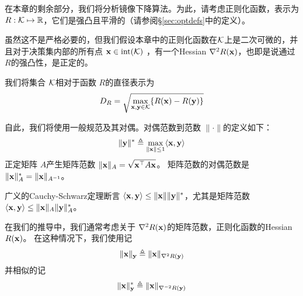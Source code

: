 在本章的剩余部分，我们将分析镜像下降算法。为此，请考虑正则化函数，表示为 $R : \mathcal K \mapsto {\mathbb R} $，它们是强凸且平滑的（请参阅\S\ref{sec:optdefs}中的定义）。

虽然这不是严格必要的，但我们假设本章中的正则化函数在$\mathcal K$上是二次可微的，并且对于决策集内部的所有点 $\mathbf x \in \text{int}(\mathcal K)$ ，有一个Hessian $\nabla^2 R(\mathbf x)$，也即是说通过 $R$的强凸性，是正定的。

我们将集合 $\mathcal K$相对于函数 $R$的直径表示为
$$ D_R = \sqrt{ \max_{\mathbf x,\mathbf y \in \mathcal K} \{ R(\mathbf x) - R(\mathbf y) \}}$$ 

自此，我们将使用一般规范及其对偶。对偶范数到范数 $\| \cdot \|$的定义如下：
$$ \| \mathbf y \|^* \triangleq \max_{ \| \mathbf x \| \leq 1 }  \langle \mathbf x, \mathbf y \rangle $$
正定矩阵 $A$产生矩阵范数 $\|\mathbf x\|_A = \sqrt{\mathbf x^\top A \mathbf x}$。
矩阵范数的对偶范数是 $\|\mathbf x\|_A^*=\|\mathbf x\|_{A^{-1}}$。

广义的Cauchy-Schwarz定理断言 $ \langle \mathbf x , \mathbf y \rangle \leq \| \mathbf x \| \| \mathbf y \|^*$，尤其是矩阵范数 $\langle \mathbf x , \mathbf y \rangle \leq \|\mathbf x\|_A \| \mathbf y\|_A^*$。

在我们的推导中，我们通常考虑关于 $\nabla^2R(\mathbf x)$的矩阵范数，正则化函数的Hessian $R(\mathbf x)$。
在这种情况下，我们使用记
$$\|\mathbf x\|_{\mathbf y} \triangleq \|\mathbf x\|_{\nabla^2 {R}(\mathbf y)}$$
并相似的记
$$\|\mathbf x\|_{\mathbf y}^* \triangleq \|\mathbf x\|_{\nabla^{-2} {R}(\mathbf y)}$$


